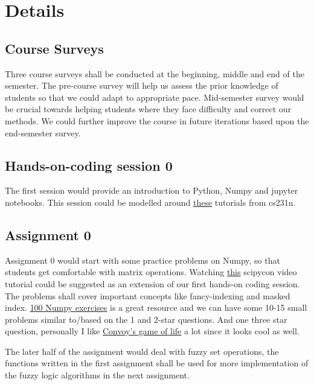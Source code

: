 \documentclass{article} %
\begin{document}
\section{Details}

\subsection{Course Surveys}

Three course surveys shall be conducted at the beginning, middle and end of the
semester. The pre-course survey will help us assess the prior knowledge of students
so that we could adapt to appropriate pace. Mid-semester survey would be crucial
towards helping students where they face difficulty and correct our methods.
We could further improve the course in future iterations based upon the end-semester survey.

\subsection{Hands-on-coding session 0}

The first session would provide an introduction to Python, Numpy and jupyter notebooks.
This session could be modelled around \href{http://cs231n.github.io/python-numpy-tutorial/}{these} tutorials from cs231n.

\subsection{Assignment 0}

Assignment 0 would start with some practice problems on Numpy, so that students get comfortable with matrix operations.
Watching \href{https://www.youtube.com/watch?v=gtejJ3RCddE}{this} scipycon video tutorial could be suggested as an extension of our
first hands-on coding session. The problems shall cover important concepts like fancy-indexing and masked index.
\href{http://www.labri.fr/perso/nrougier/teaching/numpy.100/}{100 Numpy exercises} is a great resource and we can have some 10-15 small problems
similar to/based on the 1 and 2-star questions. And one three star question, personally I like \href{https://en.wikipedia.org/wiki/Conway%27s_Game_of_Life}{Convoy's game of life} a lot since it looks cool as well.

The later half of the assignment would deal with fuzzy set operations, the functions written in the first assignment shall be
used for more implementation of the fuzzy logic algorithms in the next assignment.
\end{document}
